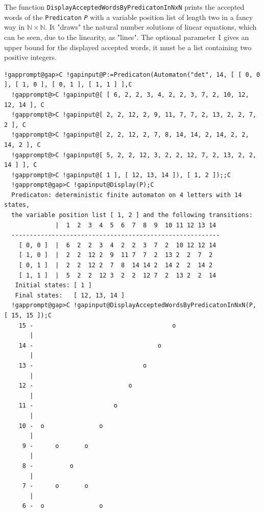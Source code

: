 \documentclass[a4paper,11pt]{report}
\begin{document}
{{{ The function \texttt{DisplayAcceptedWordsByPredicatonInNxN} prints the accepted words of the \texttt{Predicaton} \mbox{\texttt{\mdseries\slshape P}} with a variable position list of length two in a fancy way in ${\ensuremath{\mathbb N}} \times {\ensuremath{\mathbb N}}$. It "draws" the natural number solutions of linear equations, which can be
seen, due to the linearity, as "lines". The optional parameter \mbox{\texttt{\mdseries\slshape l}} gives an upper bound for the displayed accepted words, it must be a list
containing two positive integers. 
\begin{Verbatim}[commandchars=!@C,fontsize=\small,frame=single,label=Example]
  !gapprompt@gap>C !gapinput@P:=Predicaton(Automaton("det", 14, [ [ 0, 0 ], [ 1, 0 ], [ 0, 1 ], [ 1, 1 ] ],C
  !gapprompt@>C !gapinput@[ [ 6, 2, 2, 3, 4, 2, 2, 3, 7, 2, 10, 12, 12, 14 ], C
  !gapprompt@>C !gapinput@[ 2, 2, 12, 2, 9, 11, 7, 7, 2, 13, 2, 2, 7, 2 ], C
  !gapprompt@>C !gapinput@[ 2, 2, 12, 2, 7, 8, 14, 14, 2, 14, 2, 2, 14, 2 ], C
  !gapprompt@>C !gapinput@[ 5, 2, 2, 12, 3, 2, 2, 12, 7, 2, 13, 2, 2, 14 ] ], C
  !gapprompt@>C !gapinput@[ 1 ], [ 12, 13, 14 ]), [ 1, 2 ]);;C
  !gapprompt@gap>C !gapinput@Display(P);C
  Predicaton: deterministic finite automaton on 4 letters with 14 states, 
  the variable position list [ 1, 2 ] and the following transitions:
              |  1  2  3  4  5  6  7  8  9  10 11 12 13 14 
  ---------------------------------------------------------
    [ 0, 0 ]  |  6  2  2  3  4  2  2  3  7  2  10 12 12 14 
    [ 1, 0 ]  |  2  2  12 2  9  11 7  7  2  13 2  2  7  2  
    [ 0, 1 ]  |  2  2  12 2  7  8  14 14 2  14 2  2  14 2  
    [ 1, 1 ]  |  5  2  2  12 3  2  2  12 7  2  13 2  2  14 
   Initial states: [ 1 ]
   Final states:   [ 12, 13, 14 ]
  !gapprompt@gap>C !gapinput@DisplayAcceptedWordsByPredicatonInNxN(P, [ 15, 15 ]);C
    15 -                                      o                         
       |
    14 -                                  o                             
       |
    13 -                              o                                 
       |
    12 -                          o                                     
       |
    11 -                      o                                         
       |
    10 -  o               o                                             
       |
     9 -      o       o                                                 
       |
     8 -          o                                                     
       |
     7 -      o       o                                                 
       |
     6 -  o               o                                             

\end{Verbatim}}}}
\end{document}
